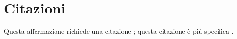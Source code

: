 \section{Citazioni}

Questa affermazione richiede una citazione \cite{book_key}; questa citazione è più specifica \cite[122]{article_key}.